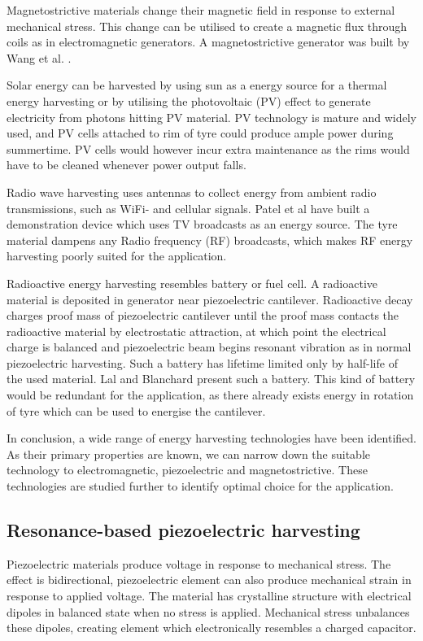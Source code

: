 Magnetostrictive materials change their magnetic field in response to external mechanical stress. This change can be utilised to create a magnetic flux through coils as in electromagnetic generators. A magnetostrictive generator was built by Wang et al. \cite{Wang2006}. 

Solar energy can be harvested by using sun as a energy source for a thermal energy harvesting or by utilising the photovoltaic (PV) effect to generate electricity from photons hitting PV material. PV technology is mature and widely used, and PV cells attached to rim of tyre could produce ample power during summertime. PV cells would however incur extra maintenance as the rims would have to be cleaned whenever power output falls. 

Radio wave harvesting uses antennas to collect energy from ambient radio transmissions, such as WiFi- and cellular signals. Patel et al \cite{Patel2014} have built a demonstration device which uses TV broadcasts as an energy source. The tyre material dampens any Radio frequency (RF) broadcasts, which makes RF energy harvesting poorly suited for the application.

Radioactive energy harvesting resembles battery or fuel cell. A radioactive material is deposited in generator near piezoelectric cantilever. Radioactive decay charges proof mass of piezoelectric cantilever until the proof mass contacts the radioactive material by electrostatic attraction, at which point the electrical charge is balanced and piezoelectric beam begins resonant vibration as in normal piezoelectric harvesting. Such a battery has lifetime limited only by half-life of the used material. Lal and Blanchard \cite{Lal2004} present such a battery. This kind of battery would be redundant for the application, as there already exists energy in rotation of tyre which can be used to energise the cantilever. 

In conclusion, a wide range of energy harvesting technologies have been identified. As their primary properties are known, we can narrow down the suitable technology to electromagnetic, piezoelectric and magnetostrictive. These technologies are studied further to identify optimal choice for the application.

\subsection{Resonance-based piezoelectric harvesting}
Piezoelectric materials produce voltage in response to mechanical stress. The effect is bidirectional, piezoelectric element can also produce mechanical strain in response to applied voltage. The material has crystalline structure with electrical dipoles in balanced state when no stress is applied. Mechanical stress unbalances these dipoles, creating element which electronically resembles a charged capacitor. 

